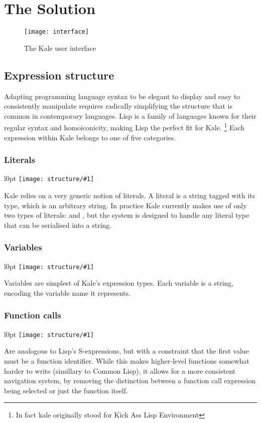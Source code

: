 \chapter{The Solution}

\begin{figure}[t]
\texttt{[image: interface]}
\caption{The Kale user interface}
\end{figure}


\section{Expression structure}

Adapting programming language syntax to be elegant to display and easy to
consistently manipulate requires radically simplifying the structure that is
common in contemporary languages. Lisp \citep{McCarthy1960} is a family of
languages known for their regular syntax and homoiconicity, making Lisp the
perfect fit for Kale.%
\footnote{In fact kale originally stood for Kick Ass Lisp Environment}
Each expression within Kale belongs to one of five categories.

\newcommand{\exprfig}[1]{
  \begin{wrapfigure}{l}{0pt}
    \texttt{[image: structure/\#1]}
\end{wrapfigure}

}
\subsection{Literals}
\label{expr:literal}
\exprfig{literal}
Kale relies on a very generic notion of literals. A literal is a string
tagged with its type, which is an arbitrary string. In practice Kale currently
makes use of only two types of literals:  and , but the
system is designed to handle any literal type that can be serialised into a
string.

\needspace{3cm}
\subsection{Variables}
\label{expr:variable}
\exprfig{variable}
Variables are simplest of Kale's expression types. Each variable is a string,
encoding the variable name it represents. 

\subsection{Function calls}
\label{expr:function}
\exprfig{function}
Are analogous to Lisp's S-expressions, but with a constraint that the first
value must be a function identifier. While this makes higher-level functions
somewhat harder to write (simillary to Common Lisp), it allows for a more
consistent navigation system, by removing the distinction between a function
call expression being selected or just the function itself.

